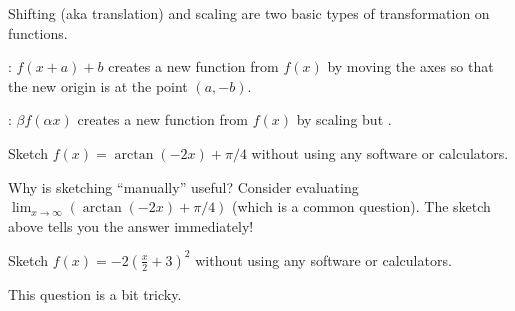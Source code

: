 \documentclass[../main.tex]{subfiles}
\begin{document}
\clearpage

Shifting (aka translation) and scaling are two basic types of transformation on functions.

: \(f(x + a) + b\) creates a new function from \(f(x)\) by moving the axes so that the new origin is at the point \((a, -b)\).


: \(\beta f(\alpha x)\) creates a new function from \(f(x)\) by scaling  but .


\clearpage
\begin{example}
  Sketch \(f(x) = \arctan(-2x) + \pi/4\) without using any software or calculators.


  


  

\end{example}

Why is sketching ``manually'' useful? Consider evaluating \(\lim_{x \to \infty} \left( \arctan(-2x) + \pi/4 \right)\) (which is a common question). The sketch above tells you the answer immediately!
\clearpage

\begin{example}
  Sketch \(f(x) = -2\left(\frac{x}{2} + 3\right)^{2}\) without using any software or calculators.

  {\scriptsize This question is a bit tricky.}

\end{example}
\end{document}
